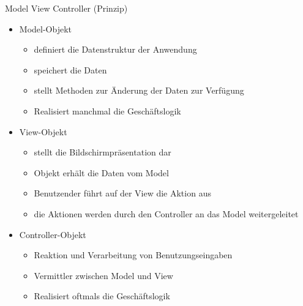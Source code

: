 \begin{defi}{Model View Controller (Prinzip)}
    \begin{itemize}
        \item Model-Objekt
              \begin{itemize}
                  \item definiert die Datenstruktur der Anwendung
                  \item speichert die Daten
                  \item stellt Methoden zur Änderung der Daten zur Verfügung
                  \item Realisiert manchmal die Geschäftslogik
              \end{itemize}
        \item View-Objekt
              \begin{itemize}
                  \item stellt die Bildschirmpräsentation dar
                  \item Objekt erhält die Daten vom Model
                  \item Benutzender führt auf der View die Aktion aus
                  \item die Aktionen werden durch den Controller an das Model weitergeleitet
              \end{itemize}
        \item Controller-Objekt
              \begin{itemize}
                  \item Reaktion und Verarbeitung von Benutzungseingaben
                  \item Vermittler zwischen Model und View
                  \item Realisiert oftmals die Geschäftslogik
              \end{itemize}
    \end{itemize}
\end{defi}


